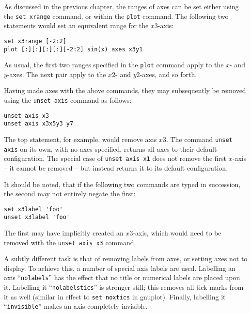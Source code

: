 \documentclass[a4paper,onecolumn,11pt]{book}
\begin{document}
As discussed in the previous chapter, the ranges of axes can be set either
using the \texttt{set xrange} command, or within the \texttt{plot} command. The following two
statements would set an equivalent range for the $x3$-axis:

\begin{verbatim}
set x3range [-2:2]
plot [:][:][:][:][-2:2] sin(x) axes x3y1
\end{verbatim}

\noindent As usual, the first two ranges specified in the \texttt{plot} command
apply to the $x$- and $y$-axes. The next pair apply to the $x2$- and $y2$-axes,
and so forth.

\label{axis_removal} Having made axes with the above commands, they may
subsequently be removed using the \texttt{unset axis} command as follows:

\begin{verbatim}
unset axis x3
unset axis x3x5y3 y7
\end{verbatim}

\noindent The top statement, for example, would remove axis $x3$. The command
\texttt{unset axis} on its own, with no axes specified, returns all axes to
their default configuration.  The special case of \texttt{unset axis x1} does
not remove the first $x$-axis -- it cannot be removed -- but instead returns it
to its default configuration.

It should be noted, that if the following two commands are typed in succession,
the second may not entirely negate the first:

\begin{verbatim}
set x3label 'foo'
unset x3label 'foo'
\end{verbatim}

\noindent The first may have implicitly created an $x3$-axis, which would need
to be removed with the \texttt{unset axis x3} command.

A subtly different task is that of removing labels from axes, or setting axes
not to display. To achieve this, a number of special axis labels are used.
Labelling an axis ``\texttt{nolabels}'' has the effect that no title or numerical
labels are placed upon it. Labelling it\label{nolabelstics}
``\texttt{nolabelstics}'' is stronger still; this removes all tick marks from it as well
(similar in effect to \texttt{set noxtics} in gnuplot). Finally, labelling it
``\texttt{invisible}''
makes an axis completely invisible.
\end{document}
